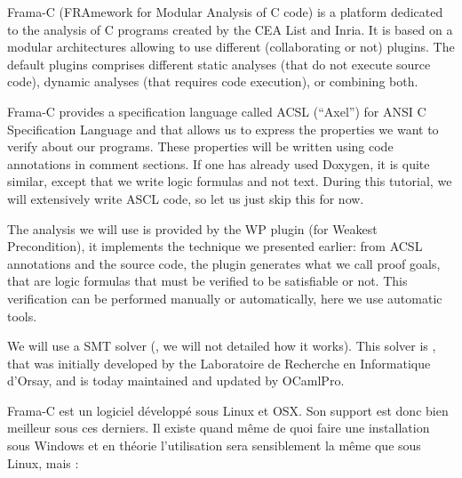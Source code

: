 
\begin{center}
\end{center}





Frama-C (FRAmework for Modular Analysis of C code) is a platform
dedicated to the analysis of C programs created by the CEA List and
Inria. It is based on a modular architectures allowing to use different
(collaborating or not) plugins. The default plugins comprises different
static analyses (that do not execute source code), dynamic analyses
(that requires code execution), or combining both.



Frama-C provides a specification language called ACSL (``Axel'') for
ANSI C Specification Language and that allows us to express the
properties we want to verify about our programs. These properties will
be written using code annotations in comment sections. If one has
already used Doxygen, it is quite similar, except that we write logic
formulas and not text. During this tutorial, we will extensively write
ASCL code, so let us just skip this for now.



The analysis we will use is provided by the WP plugin (for Weakest
Precondition), it implements the technique we presented earlier: from
ACSL annotations and the source code, the plugin generates what we call
proof goals, that are logic formulas that must be verified to be
satisfiable or not. This verification can be performed manually or
automatically, here we use automatic tools.



We will use a SMT solver
(, we will not detailed how it works). This solver is
, that was initially developed
by the Laboratoire de Recherche en Informatique d'Orsay, and is today
maintained and updated by OCamlPro.





Frama-C est un logiciel développé sous Linux et OSX. Son support est donc bien
meilleur sous ces derniers. Il existe quand même de quoi faire une installation 
sous Windows et en théorie l'utilisation sera sensiblement la même que sous 
Linux, mais :



